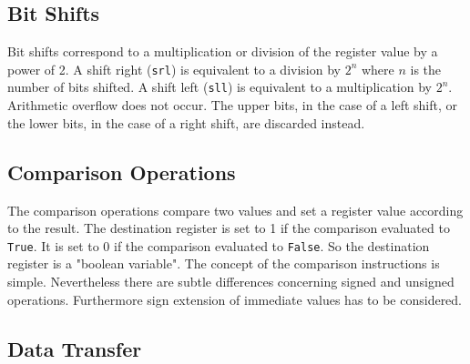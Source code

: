 \subsection{Bit Shifts}

Bit shifts correspond to a multiplication or division of the register value by a power of 2.
A shift right (\verb"srl") is equivalent to a division by $2^{n}$ where $n$ is the number of bits shifted.
A shift left (\verb"sll") is equivalent to a multiplication by $2^{n}$. Arithmetic overflow does not occur.
The upper bits, in the case of a left shift, or the lower bits, in the case of a right shift, are
discarded instead.

\subsection{Comparison Operations}

The comparison operations compare two values and set a register value according to the result. The destination
register is set to 1 if the comparison evaluated to \verb"True". It is set to 0 if the comparison evaluated to \verb"False".
So the destination register is a "boolean variable". The concept of the comparison instructions is simple.
Nevertheless there are subtle differences concerning signed and unsigned operations. Furthermore sign extension
of immediate values has to be considered.   

\subsection{Data Transfer}

